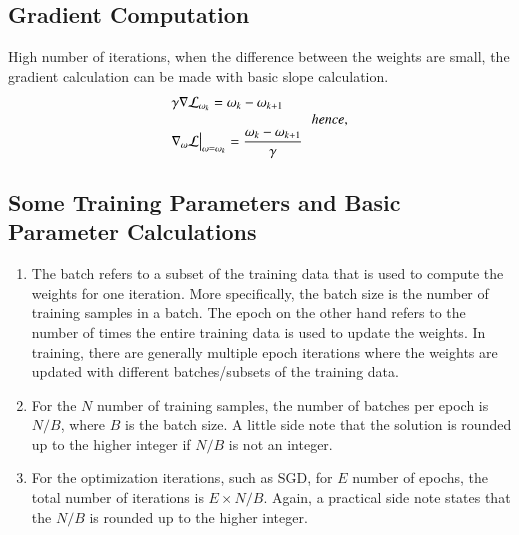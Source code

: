 \documentclass[3p,times,procedia]{elsarticle}
\begin{document}

\vspace{-0.5em}
\subsection{\textbf{Gradient Computation}}
High number of iterations, when the difference between the weights are small, the gradient calculation can be made with basic slope calculation.
\vspace{-0.7em}
\begin{equation*}
    \begin{array}{l}
         \textrm{$ \textstyle  \gamma \nabla \mathcal{L}_{\omega_{k}} = \omega_{k} - \omega_{k+1}  $} \\
        \hspace{10em} hence, \\
         \displaystyle \textrm{$  \nabla_{\omega} \mathcal{L}\big\rvert_{\omega = \omega_{k}} = \frac{\omega_{k} - \omega_{k+1}}{\gamma}$}   \\
    \end{array}
\end{equation*}

\subsection{\textbf{Some Training Parameters and Basic Parameter Calculations}}
\begin{enumerate}
    \item The batch refers to a subset of the training data that is used to compute the weights for one iteration. More specifically, the batch size is the number of training samples in a batch.
 The epoch on the other hand refers to the number of times the entire training data is used to update the weights. In training, there are generally multiple epoch iterations where the weights are updated with different batches/subsets of the training data.
    \item For the $N$ number of training samples, the number of batches per epoch is $N/B$, where $B$ is the batch size. A little side note that the solution is rounded up to the higher integer if $N/B$ is not an integer.
    \item For the optimization iterations, such as SGD, for $E$ number of epochs, the total number of iterations is $E \times N/B$. Again, a practical side note states that the $N/B$ is rounded up to the higher integer.
\end{enumerate}
\end{document}
